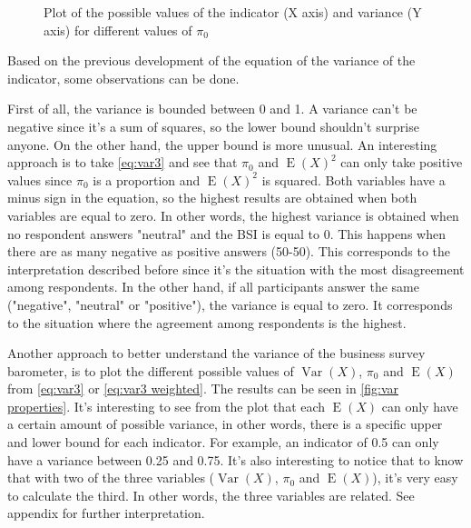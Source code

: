 \documentclass[12pt,a4paper,oneside]{book}
\DeclareMathOperator{\Var}{Var}
\DeclareMathOperator{\E}{E}
\begin{document}
\begin{figure}[hbt!]
    \caption{Plot of the possible values of the indicator (X axis) and variance (Y axis) for different values of $\pi_0$ }
    \label{fig:var properties}
\end{figure}


Based on the previous development of the equation of the variance of the indicator, some observations can be done.

First of all, the variance is bounded between 0 and 1. 
A variance can't be negative since it's a sum of squares, so the lower bound shouldn't surprise anyone. On the other hand, the upper bound is more unusual. 
An interesting approach is to take \autoref{eq:var3} and see that $\pi_0$ and $\E(X)^2$ can only take positive values since $\pi_0$ is a proportion and $\E(X)^2$ is squared. 
Both variables have a minus sign in the equation, so the highest results are obtained when both variables are equal to zero.
In other words, the highest variance is obtained when no respondent answers "neutral" and the BSI is equal to 0. 
This happens when there are as many negative as positive answers (50-50).
This corresponds to the interpretation described before since it's the situation with the most disagreement among respondents.
In the other hand, if all participants answer the same ("negative", "neutral" or "positive"), the variance is equal to zero.
It corresponds to the situation where the agreement among respondents is the highest.

Another approach to better understand the variance of the business survey barometer, is to plot the different possible values of $\Var(X)$, $\pi_0$ and $\E(X)$ from \autoref{eq:var3} or \autoref{eq:var3 weighted}. The results can be seen in \autoref{fig:var properties}.
It's interesting to see from the plot that each $\E(X)$ can only have a certain amount of possible variance, in other words, there is a specific upper and lower bound for each indicator. For example, an indicator of 0.5 can only have a variance between 0.25 and 0.75.
It's also interesting to notice that to know that with two of the three variables ($\Var(X)$, $\pi_0$ and $\E(X)$), it's very easy to calculate the third. 
In other words, the three variables are related. 
See appendix  for further interpretation.
\end{document}
